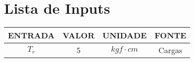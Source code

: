 \documentclass[oneside,12pt,a4paper]{report}
\begin{document}
\chapter*{Lista de Inputs}

\begin{center}
\begin{tabular}{c|c|c|c}

\textbf{ENTRADA} & \textbf{VALOR} & \textbf{UNIDADE} & \textbf{FONTE} \\ 
\midrule
$T_r$ & 5 & $kgf \cdot cm$  & Cargas
\end{tabular}
\end{center}
\end{document}

